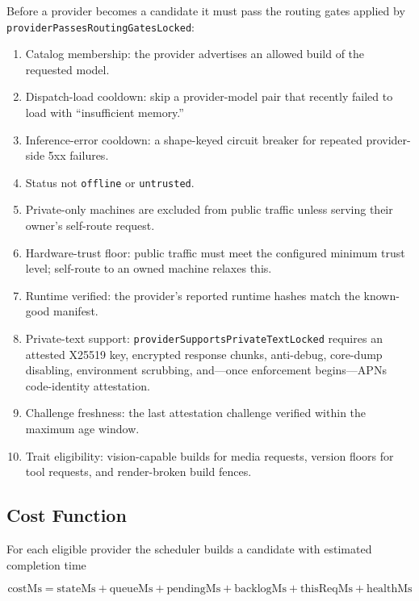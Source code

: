\documentclass[10pt,twocolumn,letterpaper]{article}
\begin{document}
Before a provider becomes a candidate it must pass the routing gates applied by \texttt{providerPassesRoutingGatesLocked}:
\begin{enumerate}[leftmargin=*,itemsep=1pt]
    \item Catalog membership: the provider advertises an allowed build of the requested model.
    \item Dispatch-load cooldown: skip a provider-model pair that recently failed to load with ``insufficient memory.''
    \item Inference-error cooldown: a shape-keyed circuit breaker for repeated provider-side 5xx failures.
    \item Status not \texttt{offline} or \texttt{untrusted}.
    \item Private-only machines are excluded from public traffic unless serving their owner's self-route request.
    \item Hardware-trust floor: public traffic must meet the configured minimum trust level; self-route to an owned machine relaxes this.
    \item Runtime verified: the provider's reported runtime hashes match the known-good manifest.
    \item Private-text support: \texttt{providerSupportsPrivateTextLocked} requires an attested X25519 key, encrypted response chunks, anti-debug, core-dump disabling, environment scrubbing, and---once enforcement begins---APNs code-identity attestation.
    \item Challenge freshness: the last attestation challenge verified within the maximum age window.
    \item Trait eligibility: vision-capable builds for media requests, version floors for tool requests, and render-broken build fences.
\end{enumerate}

\subsection{Cost Function}

For each eligible provider the scheduler builds a candidate with estimated completion time

\begin{equation}
\label{eq:cost}
\text{costMs} = \text{stateMs} + \text{queueMs} + \text{pendingMs} + \text{backlogMs} + \text{thisReqMs} + \text{healthMs}
\end{equation}
\end{document}
